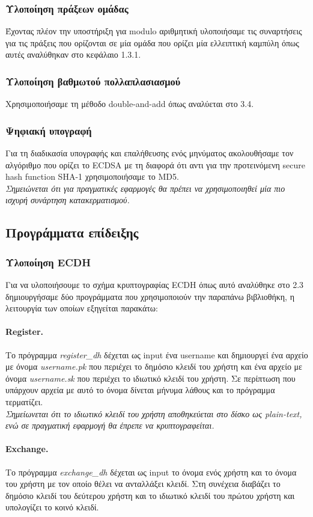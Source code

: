 \documentclass[12pt]{article}
\begin{document}
\subsubsection{Υλοποίηση πράξεων ομάδας}
Έχοντας πλέον την υποστήριξη για modulo αριθμητική υλοποιήσαμε τις συναρτήσεις για τις πράξεις που ορίζονται σε μία ομάδα που ορίζει μία ελλειπτική καμπύλη όπως αυτές αναλύθηκαν στο κεφάλαιο 1.3.1.
\subsubsection{Υλοποίηση βαθμωτού πολλαπλασιασμού}
Χρησιμοποιήσαμε τη μέθοδο double-and-add όπως αναλύεται στο 3.4.
\subsubsection{Ψηφιακή υπογραφή}
Για τη διαδικασία υπογραφής και επαλήθευσης ενός μηνύματος ακολουθήσαμε τον αλγόριθμο που ορίζει το ECDSA με τη διαφορά ότι αντι για την προτεινόμενη secure hash function SHA-1 χρησιμοποιήσαμε το MD5.
\\ \medskip
\emph{Σημειώνεται ότι για πραγματικές εφαρμογές θα πρέπει να χρησιμοποιηθεί μία πιο ισχυρή συνάρτηση κατακερματισμού.
}\subsection{Προγράμματα επίδειξης}
\subsubsection{Υλοποίηση ECDH}
Για να υλοποιήσουμε το σχήμα κρυπτογραφίας ECDH όπως αυτό αναλύθηκε στο 2.3 δημιουργήσαμε δύο προγράμματα που χρησιμοποιούν την παραπάνω βιβλιοθήκη, η λειτουργία των οποίων εξηγείται παρακάτω:
\paragraph{Register.} Το πρόγραμμα \emph{register\_dh} δέχεται ως input ένα username και δημιουργεί ένα αρχείο με όνομα \emph{username.pk} που περιέχει το δημόσιο κλειδί του χρήστη και ένα αρχείο με όνομα \emph{username.sk} που περιέχει το ιδιωτικό κλειδί του χρήστη. Σε περίπτωση που υπάρχουν αρχεία με αυτό το όνομα δίνεται μήνυμα λάθους και το πρόγραμμα τερματίζει. \\
\medskip
\emph{Σημείωνεται ότι το ιδιωτικό κλειδί του χρήστη αποθηκεύεται στο δίσκο ως plain-text,  ενώ σε πραγματική εφαρμογή θα έπρεπε να κρυπτογραφείται.}
\paragraph{Exchange.} Το πρόγραμμα \emph{exchange\_dh} δέχεται ως input το όνομα ενός χρήστη και το όνομα του χρήστη με τον οποίο θέλει να ανταλλάξει κλειδί. Στη συνέχεια διαβάζει το δημόσιο κλειδί του δεύτερου χρήστη και το ιδιωτικό κλειδί του πρώτου χρήστη και υπολογίζει το κοινό κλειδί.
\end{document}
